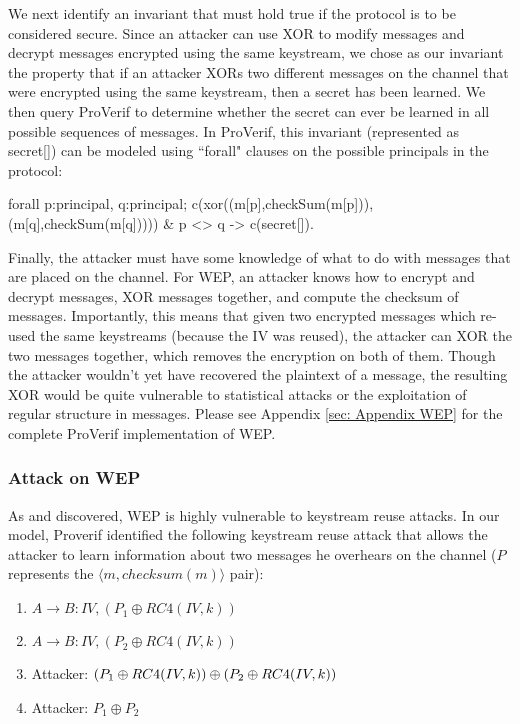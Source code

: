 \documentclass[11pt, twocolumn]{article} %
\begin{document}
{We next identify an invariant that must hold true if the protocol is to be considered secure.  Since an attacker can use XOR to modify messages and decrypt messages encrypted using the same keystream, we chose as our invariant the property that if an attacker XORs two different messages on the channel that were encrypted using the same keystream, then a secret has been learned.  We then query ProVerif to determine whether the secret can ever be learned in all possible sequences of messages.  In ProVerif, this invariant (represented as secret[]) can be modeled using ``forall" clauses on the possible principals in the protocol:

\begin{verbatimtab}[4] 
forall p:principal, q:principal; 
	c(xor((m[p],checkSum(m[p])),
		(m[q],checkSum(m[q])))) 
			& p <> q -> c(secret[]).
\end{verbatimtab}

Finally, the attacker must have some knowledge of what to do with messages that are placed on the channel.  For WEP, an attacker knows how to encrypt and decrypt messages, XOR messages together, and compute the checksum of messages.  Importantly, this means that given two encrypted messages which re-used the same keystreams (because the IV was reused), the attacker can XOR the two messages together, which removes the encryption on both of them.  Though the attacker wouldn't yet have recovered the plaintext of a message, the resulting XOR would be quite vulnerable to statistical attacks or the exploitation of regular structure in messages.  Please see Appendix \ref{sec: Appendix WEP} for the complete ProVerif implementation of WEP.
\subsubsection{Attack on WEP}
As \cite{lafourcade10} and \cite{borisov01} discovered, WEP is highly vulnerable to keystream reuse attacks.  In our model, Proverif identified the following keystream reuse attack that allows the attacker to learn information about two messages he overhears on the channel ($P$ represents the $\langle m, checksum(m)\rangle$ pair):

\begin{enumerate}
\item $A\rightarrow B:  IV, (P_1 \oplus RC4(IV, k))$
\item $A \rightarrow B: IV, (P_2 \oplus RC4(IV, k))$
\item Attacker: $(P_1 \oplus RC4(IV, k)) \oplus \\(P_2 \oplus RC4(IV, k))$
\item Attacker: $P_1 \oplus P_2$
\end{enumerate}

}
\end{document}
